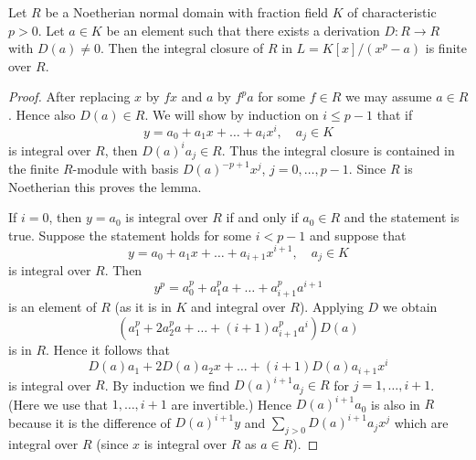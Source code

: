 \begin{lemma}
\label{lemma-Noetherian-normal-domain-insep-extension}
Let $R$ be a Noetherian normal domain with fraction field $K$
of characteristic $p > 0$.
Let $a \in K$ be an element such that there exists a derivation
$D : R \to R$ with $D(a) \not = 0$. Then the integral closure
of $R$ in $L = K[x]/(x^p - a)$ is finite over $R$.
\end{lemma}

\begin{proof}
After replacing $x$ by $fx$ and $a$ by $f^pa$ for some $f \in R$
we may assume $a \in R$. Hence also $D(a) \in R$. We will show
by induction on $i \leq p - 1$ that if
$$
y = a_0 + a_1x + \ldots + a_i x^i,\quad a_j \in K
$$
is integral over $R$, then $D(a)^i a_j \in R$. Thus the integral
closure is contained in the finite $R$-module with basis
$D(a)^{-p + 1}x^j$, $j = 0, \ldots, p - 1$. Since $R$ is Noetherian
this proves the lemma.

\medskip\noindent
If $i = 0$, then $y = a_0$ is integral over $R$ if and only if $a_0 \in R$
and the statement is true. Suppose the statement holds for some $i < p - 1$
and suppose that
$$
y = a_0 + a_1x + \ldots + a_{i + 1} x^{i + 1},\quad a_j \in K
$$
is integral over $R$. Then
$$
y^p = a_0^p + a_1^p a + \ldots + a_{i + 1}^pa^{i + 1}
$$
is an element of $R$ (as it is in $K$ and integral over $R$). Applying
$D$ we obtain
$$
(a_1^p + 2a_2^p a + \ldots + (i + 1)a_{i + 1}^p a^i)D(a)
$$
is in $R$. Hence it follows that
$$
D(a)a_1 + 2D(a) a_2 x + \ldots + (i + 1)D(a) a_{i + 1} x^i
$$
is integral over $R$. By induction we find $D(a)^{i + 1}a_j \in R$
for $j = 1, \ldots, i + 1$. (Here we use that $1, \ldots, i + 1$
are invertible.) Hence $D(a)^{i + 1}a_0$ is also in $R$ because it is the
difference of $D(a)^{i + 1}y$ and $\sum_{j > 0} D(a)^{i + 1}a_jx^j$ which
are integral over $R$ (since $x$ is integral over $R$ as $a \in R$).
\end{proof}